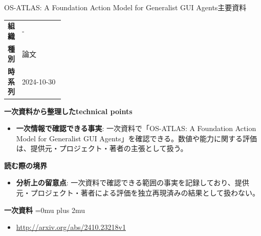 \begin{technicalnote}{OS-ATLAS: A Foundation Action Model for Generalist GUI Agents}{主要資料}
\begingroup
\begin{tabularx}{\linewidth}{@{}>{\bfseries}p{0.22\linewidth}X@{}}
組織 & - \\
種別 & 論文 \\
時系列 & 2024-10-30 \\
\end{tabularx}
\smallskip
{\bfseries 一次資料から整理したtechnical points}
\begin{itemize}[leftmargin=1.5em,itemsep=0.35em]
\item \textbf{一次情報で確認できる事実}: 一次資料で「OS-ATLAS: A Foundation Action Model for Generalist GUI Agents」を確認できる。数値や能力に関する評価は、提供元・プロジェクト・著者の主張として扱う。
\end{itemize}
\begin{minipage}{\linewidth}
{\bfseries 読む際の境界}
\begin{itemize}[leftmargin=1.5em,itemsep=0.35em]
\item \textbf{分析上の留意点}: 一次資料で確認できる範囲の事実を記録しており、提供元・プロジェクト・著者による評価を独立再現済みの結果として扱わない。
\end{itemize}
\begin{samepage}
{\bfseries 一次資料}
\begingroup\sloppy
\Urlmuskip=0mu plus 2mu\relax
\begin{itemize}[leftmargin=1.5em,itemsep=0.25em]
\item {\scriptsize\url{http://arxiv.org/abs/2410.23218v1}}
\end{itemize}
\endgroup
\end{samepage}
\end{minipage}
\endgroup
\end{technicalnote}
\medskip

